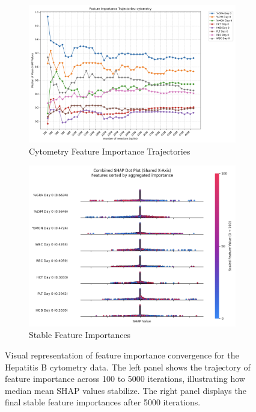 \documentclass[12pt,a4paper]{report}
\begin{document}
\begin{figure}[H]
    \centering

    \begin{subfigure}[b]{0.48\textwidth}
    \centering
    \includegraphics[width=\textwidth]{images/trajectory_cytometry_hepatitis.png}
    \caption{Cytometry Feature Importance Trajectories}
    \label{fig:trajectory_cytometry_hepatitis}
    \end{subfigure}
    \hfill
    \begin{subfigure}[b]{0.48\textwidth}
    \centering
    \includegraphics[width=\textwidth]{images/stable_features_cytometry_hepatitis.png}
    \caption{Stable Feature Importances}
    \label{fig:stable_features_cytometry_hepatitis}
    \end{subfigure}

    \caption[Hepatitis B Feature Importance Convergence]{Visual representation of feature importance convergence for the Hepatitis B cytometry data. The left panel shows the trajectory of feature importance across 100 to 5000 iterations, illustrating how median mean SHAP values stabilize. The right panel displays the final stable feature importances after 5000 iterations.}
    \label{fig:feature_trajectories_plots_hepatitis}
\end{figure}
\end{document}
